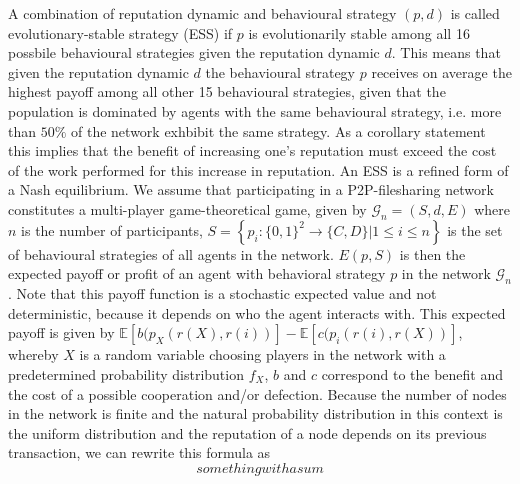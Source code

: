 \documentclass[11pt,a4paper]{article}
\theoremstyle{definition}
\theoremstyle{theorem}
\theoremstyle{proposition}
\theoremstyle{corollary}
\theoremstyle{lemma}
\theoremstyle{example}
\theoremstyle{remark}
\begin{document}
A combination of reputation dynamic and behavioural strategy $(p,d)$ is called evolutionary-stable strategy (ESS) if $p$ is evolutionarily stable among all 16 possbile behavioural strategies given the reputation dynamic $d$. This means that given the reputation dynamic $d$ the behavioural strategy $p$ receives on average the highest payoff among all other 15 behavioural strategies, given that the population is dominated by agents with the same behavioural strategy, i.e. more than $50\%$ of the network exhbibit the same strategy. As a corollary statement this implies that the benefit of increasing one's reputation must exceed the cost of the work performed for this increase in reputation. An ESS is a refined form of a Nash equilibrium. We assume that participating in a P2P-filesharing network constitutes a multi-player game-theoretical game, given by $\mathcal{G}_n=(S,d,E)$ where $n$ is the number of participants, $S=\left\lbrace{}p_i:\{0,1\}^2\rightarrow{}\{C,D\}|1\leq{}i\leq{}n\right\rbrace$ is the set of behavioural strategies of all agents in the network. $E(p,S)$ is then the expected payoff or profit of an agent with behavioral strategy $p$ in the network $\mathcal{G}_n$. Note that this payoff function is a stochastic expected value and not deterministic, because it depends on who the agent interacts with. This expected payoff is given by $\mathbb{E}[b(p_X(r(X),r(i))]-\mathbb{E}[c(p_i(r(i),r(X))]$, whereby $X$ is a random variable choosing players in the network with a predetermined probability distribution $f_X$, $b$ and $c$ correspond to the benefit and the cost of a possible cooperation and/or defection. Because the number of nodes in the network is finite and the natural probability distribution in this context is the uniform distribution and the reputation of a node depends on its previous transaction, we can rewrite this formula as
\[
something with a sum
\]    
\end{document}
